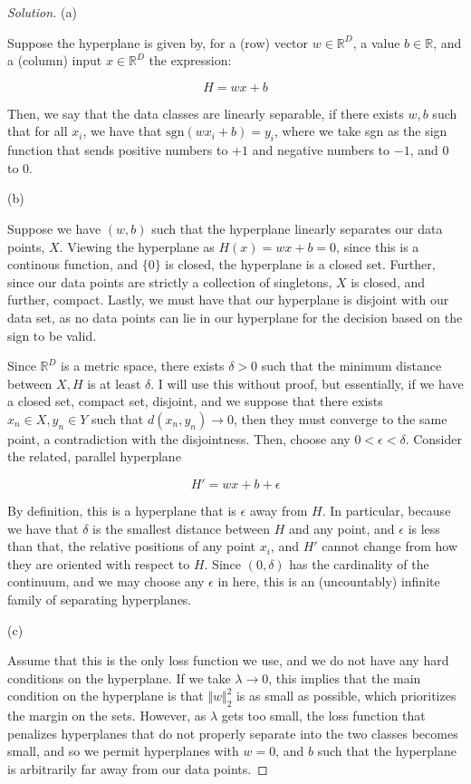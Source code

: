\documentclass[10pt]{article}
\begin{document}
\begin{proof}[Solution]

(a)

Suppose the hyperplane is given by, for a (row) vector $w \in \mathbb{R}^D$, a value $b \in \mathbb{R}$, and a (column) input $x \in \mathbb{R}^D$ the expression:

$$ H = wx + b $$

Then, we say that the data classes are linearly separable, if there exists $w, b$ such that for all $x_i$, we have that $\text{sgn}( w x_i + b) = y_i$, where we take sgn as the sign function that sends positive numbers to $+1$ and negative numbers to $-1$, and 0 to 0.

(b)

Suppose we have $(w,b)$ such that the hyperplane linearly separates our data points, $X$. Viewing the hyperplane as $H(x) = wx + b = 0$, since this is a continous function, and $\{ 0 \}$ is closed, the hyperplane is a closed set. Further, since our data points are strictly a collection of singletons, $X$ is closed, and further, compact. Lastly, we must have that our hyperplane is disjoint with our data set, as no data points can lie in our hyperplane for the decision based on the sign to be valid.

Since $\mathbb{R}^D$ is a metric space, there exists $\delta > 0$ such that the minimum distance between $X, H$ is at least $\delta$. I will use this without proof, but essentially, if we have a closed set, compact set, disjoint, and we suppose that there exists $x_n \in X, y_n \in Y$ such that $d(x_n, y_n) \to 0$, then they must converge to the same point, a contradiction with the disjointness. Then, choose any $0 < \epsilon < \delta$. Consider the related, parallel hyperplane

$$ H' = wx + b + \epsilon$$

By definition, this is a hyperplane that is $\epsilon$ away from $H$. In particular, because we have that $\delta$ is the smallest distance between $H$ and any point, and $\epsilon$ is less than that, the relative positions of any point $x_i$, and $H'$ cannot change from how they are oriented with respect to $H$. Since $(0,\delta)$ has the cardinality of the continuum, and we may choose any $\epsilon$ in here, this is an (uncountably) infinite family of separating hyperplanes.

(c)

Assume that this is the only loss function we use, and we do not have any hard conditions on the hyperplane. If we take $\lambda \to 0$, this implies that the main condition on the hyperplane is that $\Vert w \Vert_2^2$ is as small as possible, which prioritizes the margin on the sets. However, as $\lambda$ gets too small, the loss function that penalizes hyperplanes that do not properly separate into the two classes becomes small, and so we permit hyperplanes with $w = 0$, and $b$ such that the hyperplane is arbitrarily far away from our data points.


\end{proof}
\end{document}
